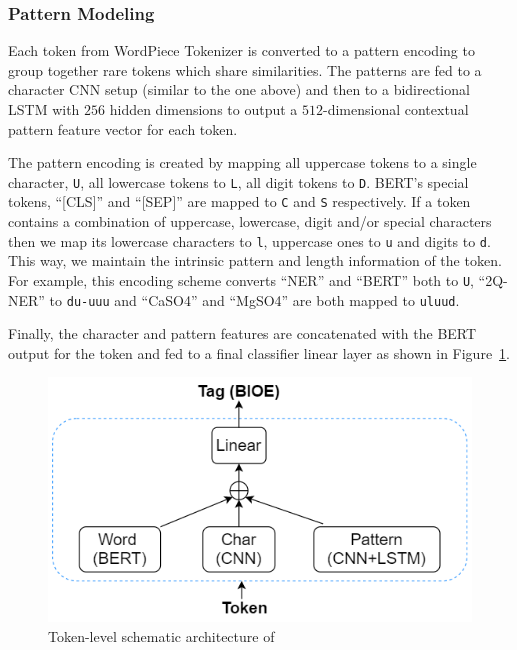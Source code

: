\subsubsection{Pattern Modeling} Each token from WordPiece Tokenizer is converted to a pattern encoding to group together rare tokens which share similarities. The patterns are fed to a character CNN setup (similar to the one above) and then to a bidirectional LSTM with $256$ hidden dimensions to output a $512$-dimensional contextual pattern feature vector for each token.

The pattern encoding is created by mapping all uppercase tokens to a single character, \texttt{U}, all lowercase tokens to \texttt{L}, all digit tokens to \texttt{D}. BERT's special tokens, ``[CLS]'' and ``[SEP]'' are mapped to \texttt{C} and \texttt{S} respectively. If a token contains a combination of uppercase, lowercase, digit and/or special characters then we map its lowercase characters to \texttt{l}, uppercase ones to \texttt{u} and digits to \texttt{d}. This way, we maintain the intrinsic pattern and length information of the token. For example, this encoding scheme converts ``NER'' and ``BERT'' both to \texttt{U}, ``2Q-NER'' to \texttt{du-uuu} and ``CaSO4'' and ``MgSO4'' are both mapped to \texttt{uluud}.

Finally, the character and pattern features are concatenated with the BERT output for the token and fed to a final classifier linear layer
as shown in  Figure~\ref{fig:span_detection}.
    

\begin{figure}[h!]
    \centering
    \includegraphics[width=0.9\linewidth]{span_det7.png}
    \caption{Token-level schematic architecture of \spandetect{}}
    \label{fig:span_detection}
\end{figure}
